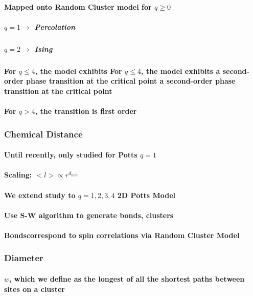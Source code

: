 \documentclass[pre,preprint]{revtex4-1}
\begin{document}
\paragraph{Mapped onto Random Cluster model for $q \ge 0$}
\label{sec-1.1.1.5}
\subparagraph{$q = 1 \to$ Percolation}
\label{sec-1.1.1.5.1}
\subparagraph{$q = 2 \to$ Ising}
\label{sec-1.1.1.5.2}
\paragraph{For $q \le 4$, the model exhibits For $q \le 4$, the model exhibits a second-order phase transition at the critical point a second-order phase transition at the critical point}
\label{sec-1.1.1.6}
\paragraph{For $q>4$, the transition is first order \cite{Bax}}
\label{sec-1.1.1.7}
\subsubsection{Chemical Distance}
\label{sec-1.1.2}
\paragraph{Until recently, only studied for Potts $q=1$}
\label{sec-1.1.2.1}
\paragraph{Scaling: $< l > \propto r^{d_{min}}$}
\label{sec-1.1.2.2}
\paragraph{We extend study to $q=1,2,3,4$ 2D Potts Model}
\label{sec-1.1.2.3}
\paragraph{Use S-W algorithm to generate bonds, clusters}
\label{sec-1.1.2.4}
\paragraph{Bondscorrespond to spin correlations via Random Cluster Model}
\label{sec-1.1.2.5}
\subsubsection{Diameter}
\label{sec-1.1.3}
\paragraph{$w$, which we define as the longest of all the shortest paths between sites on a cluster}
\label{sec-1.1.3.1}
\end{document}
